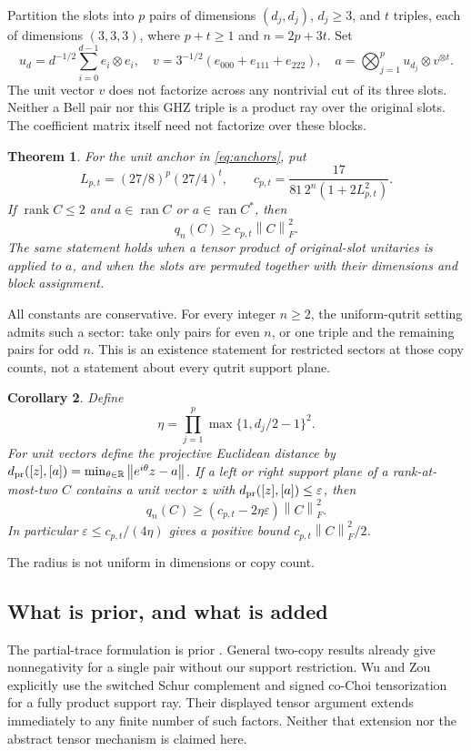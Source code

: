 \documentclass[11pt,a4paper]{article}
\newtheorem{theorem}{Theorem}
\newtheorem{corollary}[theorem]{Corollary}
\newcommand{\ran}{\operatorname{ran}}
\newcommand{\rank}{\operatorname{rank}}
\newcommand{\norm}[1]{\left\lVert#1\right\rVert}
\begin{document}
Partition the slots into $p$ pairs of dimensions $(d_j,d_j)$, $d_j\ge3$, and $t$ triples, each of dimensions $(3,3,3)$, where $p+t\ge1$ and $n=2p+3t$. Set
\begin{equation}\label{eq:anchors}
 u_d=d^{-1/2}\sum_{i=0}^{d-1}e_i\otimes e_i,\quad
 v=3^{-1/2}(e_{000}+e_{111}+e_{222}),\quad
 a=\bigotimes_{j=1}^p u_{d_j}\otimes v^{\otimes t}.
\end{equation}
The unit vector $v$ does not factorize across any nontrivial cut of its three slots. Neither a Bell pair nor this GHZ triple is a product ray over the original slots. The coefficient matrix itself need not factorize over these blocks.

\begin{theorem}\label{thm:main}
For the unit anchor in \eqref{eq:anchors}, put
\begin{equation}\label{eq:constants}
 L_{p,t}=(27/8)^p(27/4)^t,\qquad
 c_{p,t}=\frac{17}{81\,2^n(1+2L_{p,t}^2)}.
\end{equation}
If $\rank C\le2$ and $a\in\ran C$ or $a\in\ran C^*$, then
\[
 q_n(C)\ge c_{p,t}\norm C_F^2.
\]
The same statement holds when a tensor product of original-slot unitaries is applied to $a$, and when the slots are permuted together with their dimensions and block assignment.
\end{theorem}
All constants are conservative. For every integer $n\ge2$, the uniform-qutrit setting admits such a sector: take only pairs for even $n$, or one triple and the remaining pairs for odd $n$. This is an existence statement for restricted sectors at those copy counts, not a statement about every qutrit support plane.

\begin{corollary}\label{cor:continuity}
Define
\[
 \eta=\prod_{j=1}^p\max\{1,d_j/2-1\}^{2}.
\]
For unit vectors define the projective Euclidean distance by
$d_{\rm pr}([z],[a])=\min_{\theta\in\mathbb R}\norm{e^{i\theta}z-a}$.
If a left or right support plane of a rank-at-most-two $C$ contains a unit vector $z$ with $d_{\rm pr}([z],[a])\le\varepsilon$, then
\[
 q_n(C)\ge(c_{p,t}-2\eta\varepsilon)\norm C_F^2.
\]
In particular $\varepsilon\le c_{p,t}/(4\eta)$ gives a positive bound $c_{p,t}\norm C_F^2/2$.
\end{corollary}
The radius is not uniform in dimensions or copy count.

\subsection{What is prior, and what is added}
The partial-trace formulation is prior \cite{costa,bharti}. General two-copy results \cite{fu,bharti} already give nonnegativity for a single pair without our support restriction. Wu and Zou \cite[Section 7.2, Lemma 7.4 and Theorem 7.3]{wuzou} explicitly use the switched Schur complement and signed co-Choi tensorization for a fully product support ray. Their displayed tensor argument extends immediately to any finite number of such factors. Neither that extension nor the abstract tensor mechanism is claimed here.
\end{document}
